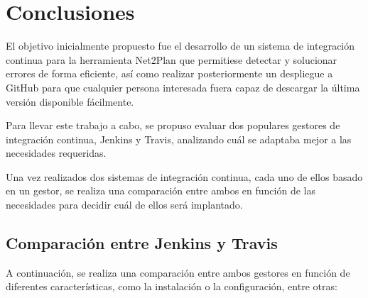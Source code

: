 \chapter{Conclusiones}

El objetivo inicialmente propuesto fue el desarrollo de un sistema de integración continua para la herramienta Net2Plan que permitiese detectar y solucionar errores de forma eficiente, así como realizar posteriormente un despliegue a GitHub para que cualquier persona interesada fuera capaz de descargar la última versión disponible fácilmente. 

Para llevar este trabajo a cabo, se propuso evaluar dos populares gestores de integración continua, Jenkins y Travis, analizando cuál se adaptaba mejor a las necesidades requeridas. 

Una vez realizados dos sistemas de integración continua, cada uno de ellos basado en un gestor, se realiza una comparación entre ambos en función de las necesidades para decidir cuál de ellos será implantado.

\section{Comparación entre Jenkins y Travis}

A continuación, se realiza una comparación entre ambos gestores en función de diferentes características, como la instalación o la configuración, entre otras:

